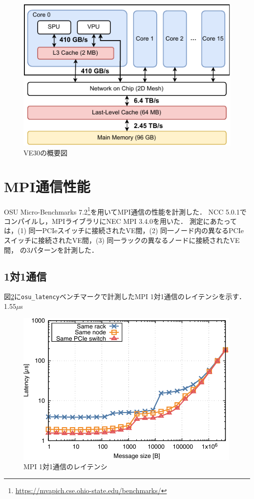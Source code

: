 ﻿\documentclass[submit,techrep,noauthor]{ipsj}
\begin{document}
\begin{figure}
  \centering
  \includegraphics{figs/ve30_memory_hierarchy.pdf}
  \caption{VE30の概要図~\cite{Takahashi2023}}\label{fig:ve30}
\end{figure}


\section{MPI通信性能}

OSU Micro-Benchmarks
7.2\footnote{\url{https://mvapich.cse.ohio-state.edu/benchmarks/}}を用いてMPI通信の性能を計測した．
NCC 5.0.1でコンパイルし，MPIライブラリにNEC MPI 3.4.0を用いた．
測定にあたっては，(1) 同一PCIeスイッチに接続されたVE間，(2)
同一ノード内の異なるPCIeスイッチに接続されたVE間，(3) 同一ラックの異なるノードに接続されたVE間，
の3パターンを計測した．

\subsection{1対1通信}

図\ref{fig:mpi-lat}に\verb|osu_latency|ベンチマークで計測したMPI 1対1通信のレイテンシを示す．
1.55$\mu$s

\begin{figure}
  \centering
  \includegraphics{figs/mpi_latency.pdf}
  \caption{MPI 1対1通信のレイテンシ}\label{fig:mpi-lat}
\end{figure}
\end{document}
